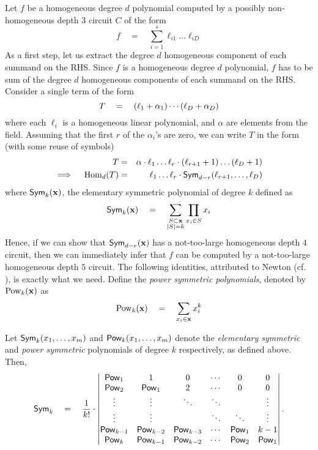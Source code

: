 Let $f$ be a homogeneous degree $d$ polynomial computed by a possibly
non-homogeneous depth $3$ circuit $C$ of the form
\[
f\quad=\quad \sum_{i=1}^s \ell_{i1}\dots \ell_{iD}
\]
As a first step, let us extract the degree $d$ homogeneous component
of each summand on the RHS.
Since $f$ is a homogeneous degree $d$ polynomial, $f$ has to be sum of
the degree $d$ homogeneous components of each summand on the RHS.
Consider a single term of the form
\[
T \quad = \quad (\ell_1 + \alpha_1)\cdots (\ell_D + \alpha_D)
\]
where each $\ell_i$ is a homogeneous linear polynomial, and $\alpha$
are elements from the field.
Assuming that the first $r$ of the $\alpha_i$'s are zero, we can write
$T$ in the form (with some reuse of symbols)
\begin{eqnarray*}
T & = &  \alpha \cdot \ell_1\dots \ell_r \cdot (\ell_{r+1} + 1)\dots (\ell_D+1)\\
\implies \quad \mathrm{Hom}_d(T) & = & \ell_1 \dots \ell_r \cdot \mathsf{Sym}_{d-r}(\ell_{r+1}, \dots, \ell_D)
\end{eqnarray*}
where $\mathsf{Sym}_{k}(\mathbf{x})$, the elementary symmetric polynomial of
degree $k$ defined as
\[
\mathsf{Sym}_k(\mathbf{x}) \quad = \quad \sum_{\substack{S\subset \mathbf{x}\\|S| = k}} \prod_{x_i\in S}x_i
\]
Hence, if we can show that $\mathsf{Sym}_{d-r}(\mathbf{x})$ has a not-too-large
homogeneous depth $4$ circuit, then we can immediately infer that $f$
can be computed by a not-too-large homogeneous depth $5$ circuit.
The following identities, attributed to Newton (cf. \cite{kalman00}),
is exactly what we need.
Define the \emph{power symmetric polynomials}, denoted by
$\mathrm{Pow}_k(\mathbf{x})$ as
\[
\mathrm{Pow}_k(\mathbf{x}) \quad = \quad \sum_{x_i \in \mathbf{x}} x_i^k
\]

\begin{lemma}\label{lem:newton-identities}
  Let $\mathsf{Sym}_k(x_1,\ldots,x_m)$ and $\mathsf{Pow}_k(x_1,\ldots,x_m)$ denote
  the \emph{elementary symmetric} and \emph{power symmetric} polynomials of degree
  $k$ respectively, as defined above.  Then,
  $$
  \mathsf{Sym}_k\quad = \quad\frac{1}{k!} \cdot 
  \begin{vmatrix}\mathsf{Pow}_1 & 1 & 0 & \cdots & 0 & 0\\ 
    \mathsf{Pow}_2 & \mathsf{Pow}_1 & 2 & \cdots & 0 & 0 \\ 
    \vdots& \vdots & \ddots & \ddots &  & \vdots \\
    \vdots& \vdots &  & \ddots & \ddots & \vdots \\
    \mathsf{Pow}_{k-1} & \mathsf{Pow}_{k-2} & \mathsf{Pow}_{k-3}& \cdots & \mathsf{Pow}_1 & k-1 \\ 
    \mathsf{Pow}_k & \mathsf{Pow}_{k-1} & \mathsf{Pow}_{k-2} & \cdots & \mathsf{Pow}_2 & \mathsf{Pow}_1 
  \end{vmatrix}.
  $$
\end{lemma}

